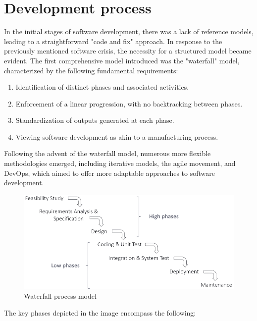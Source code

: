 \section{Development process}

In the initial stages of software development, there was a lack of reference models, leading to a straightforward "code and fix" approach. 
In response to the previously mentioned software crisis, the necessity for a structured model became evident.
The first comprehensive model introduced was the "waterfall" model, characterized by the following fundamental requirements:
\begin{enumerate}
    \item Identification of distinct phases and associated activities.
    \item Enforcement of a linear progression, with no backtracking between phases.
    \item Standardization of outputs generated at each phase.
    \item Viewing software development as akin to a manufacturing process.
\end{enumerate}
Following the advent of the waterfall model, numerous more flexible methodologies emerged, including iterative models, the agile movement, and DevOps, which aimed to offer more adaptable approaches to software development.
\begin{figure}[H]
    \centering
    \includegraphics[width=0.75\linewidth]{images/waterfall.png}
    \caption{Waterfall process model}
\end{figure}
The key phases depicted in the image encompass the following:
